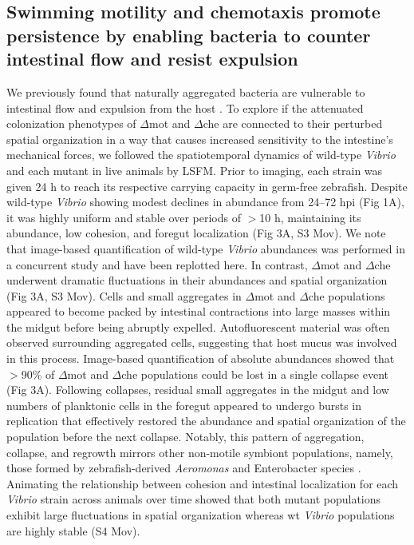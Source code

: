 \subsection{Swimming motility and chemotaxis promote persistence by enabling bacteria to counter intestinal flow and resist expulsion}
We previously found that naturally aggregated bacteria are vulnerable to intestinal flow and expulsion from the host \cite{wiles_host_2016,schlomann_sublethal_2019}. To explore if the attenuated colonization phenotypes of $\Delta$mot and $\Delta$che are connected to their perturbed spatial organization in a way that causes increased sensitivity to the intestine's mechanical forces, we followed the spatiotemporal dynamics of wild-type \textit{Vibrio} and each mutant in live animals by LSFM. Prior to imaging, each strain was given 24 h to reach its respective carrying capacity in germ-free zebrafish. Despite wild-type \textit{Vibrio} showing modest declines in abundance from 24–72 hpi (Fig 1A), it was highly uniform and stable over periods of $ > $10 h, maintaining its abundance, low cohesion, and foregut localization (Fig 3A, S3 Mov). We note that image-based quantification of wild-type \textit{Vibrio} abundances was performed in a concurrent study \cite{schlomann_sublethal_2019} and have been replotted here. In contrast, $\Delta$mot and $\Delta$che underwent dramatic fluctuations in their abundances and spatial organization (Fig 3A, S3 Mov). Cells and small aggregates in $\Delta$mot and $\Delta$che populations appeared to become packed by intestinal contractions into large masses within the midgut before being abruptly expelled. Autofluorescent material was often observed surrounding aggregated cells, suggesting that host mucus was involved in this process. Image-based quantification of absolute abundances showed that $ > $90\% of $\Delta$mot and $\Delta$che populations could be lost in a single collapse event (Fig 3A). Following collapses, residual small aggregates in the midgut and low numbers of planktonic cells in the foregut appeared to undergo bursts in replication that effectively restored the abundance and spatial organization of the population before the next collapse. Notably, this pattern of aggregation, collapse, and regrowth mirrors other non-motile symbiont populations, namely, those formed by zebrafish-derived \textit{Aeromonas} and Enterobacter species \cite{wiles_host_2016,schlomann_sublethal_2019}. Animating the relationship between cohesion and intestinal localization for each \textit{Vibrio} strain across animals over time showed that both mutant populations exhibit large fluctuations in spatial organization whereas wt \textit{Vibrio} populations are highly stable (S4 Mov).

